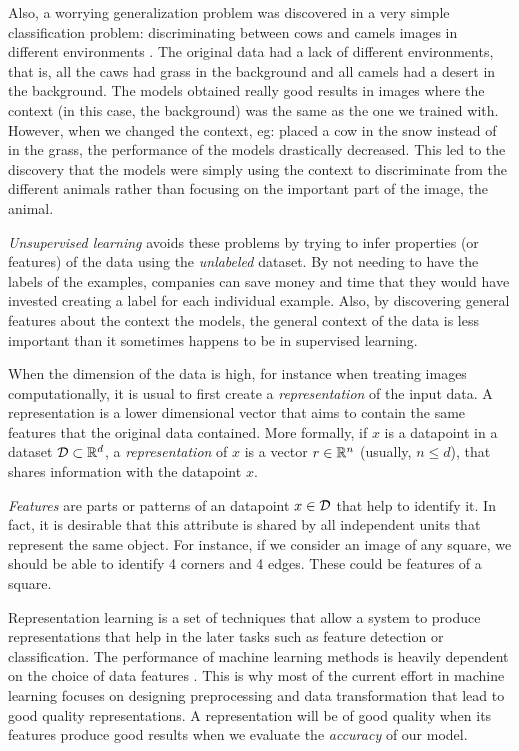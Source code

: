 Also, a worrying generalization problem was discovered in a very simple classification problem: discriminating between cows and camels images in different environments \citep{beery2018recognition}. The original data had a lack of different environments, that is, all the caws had grass in the background and all camels had a desert in the background. The models obtained really good results in images where the context (in this case, the background) was the same as the one we trained with. However, when we changed the context, eg: placed a cow in the snow instead of in the grass, the performance of the models drastically decreased. This led to the discovery that the models were simply using the context to discriminate from the different animals rather than focusing on the important part of the image, the animal.

\emph{Unsupervised learning} avoids these problems by trying to infer properties (or features) of the data using the \emph{unlabeled} dataset. By not needing to have the labels of the examples, companies can save money and time that they would have invested creating a label for each individual example. Also, by discovering general features about the context the models, the general context of the data is less important than it sometimes happens to be in supervised learning.

When the dimension of the data is high, for instance when treating images computationally, it is usual to first create a \emph{representation} of the input data. A representation is a lower dimensional vector that aims to contain the same features that the original data contained. More formally, if $x$ is a datapoint in a dataset $\mathcal{D} \subset \mathbb{R}^d$, a \emph{representation} of $x$ is a vector $r \in \mathbb{R}^n$ (usually, $n \leq d$), that shares information with the datapoint $x$. 


\emph{Features} are parts or patterns of an datapoint $x \in \mathcal{D}$ that help to identify it. In fact, it is desirable that this attribute is shared by all independent units that represent the same object. For instance, if we consider an image of any square, we should be able to identify 4 corners and 4 edges. These could be features of a square.

Representation learning is a set of techniques that allow a system to produce representations that help in the later tasks such as feature detection or classification.
The performance of machine learning methods is heavily dependent on the choice of data features \citep{bengio_representation_2014}. This is why most of the current 
effort in machine learning focuses on designing preprocessing and data transformation that lead to good quality representations. A representation will be of good quality when its features
produce good results when we evaluate the \emph{accuracy} of our model.

